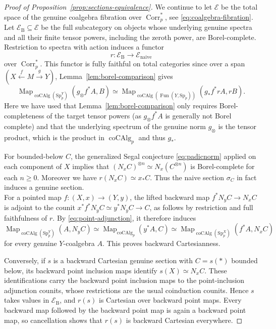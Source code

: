 \documentclass[11pt,a4paper]{article}
\theoremstyle{definition}
\newcommand{\Sp}{\mathrm{Sp}}
\newcommand{\coAlg}{\operatorname{coCAlg}}
\newcommand{\Map}{\operatorname{Map}}
\newcommand{\Fun}{\operatorname{Fun}}
\newcommand{\Corr}{\operatorname{Corr}_p}
\begin{document}
\begin{proof}[Proof of Proposition~\ref{prop:sections-equivalence}]
We continue to let $\mathcal E$ be the total space of the genuine coalgebra fibration over $\Corr^{*}$, see \eqref{eq:coalgebra-fibration}.
Let
$\mathcal E_{\mathrm B}\subseteq\mathcal E$ be the full
subcategory on objects whose underlying genuine spectra and all their
finite tensor powers, including the zeroth power, are
Borel-complete. Restriction to spectra with action induces a functor
\[
 r:\mathcal E_{\mathrm B}\longrightarrow\mathcal E_{\mathrm{naive}}
\]
 over $\Corr^*$. %
This functor is fully faithful on total categories
since over a span $(X\xleftarrow{f}M\xrightarrow{g}Y)$,
Lemma~\ref{lem:borel-comparison} gives
\[
 \Map_{\coAlg(\Sp_p^Y)}(g_\otimes f^*A,B)
 \simeq
 \Map_{\coAlg(\Fun(Y,\Sp_p))}(g_*f^*rA,rB).
\]
Here we have used  that Lemma~\ref{lem:borel-comparison} 
only requires
Borel-completeness of the target tensor powers (as $g_\otimes f^*A$ is generally not Borel complete) and that the underlying spectrum of the genuine norm $g_\otimes$ is the tensor product, which is the product in $\coAlg_p$ and thus $g_*$. 

For bounded-below $C$, the generalized Segal conjecture \eqref{eq:padicnorm} applied on each
component of $X$ implies that
$
 (N_xC)^{\otimes n}\simeq N_x(C^{\otimes n})
$
is Borel-complete for each $n\ge0$. Moreover we have $r(N_xC)\simeq x_*C$.
Thus  the naive section $\sigma_C$ in fact induces a genuine section.  \\

For a pointed map $f:(X,x)\to(Y,y)$, the lifted backward map
$f^*N_yC\to N_xC$ is adjoint to the counit
$x^*f^*N_yC\simeq y^*N_yC\to C$, as follows by restriction
and full faithfulness of $r$.
By \eqref{eq:point-adjunction}, it therefore induces
\[
 \Map_{\coAlg(\Sp_p^Y)}(A,N_yC)
 \simeq\Map_{\coAlg_p}(y^*A,C)
 \simeq\Map_{\coAlg(\Sp_p^X)}(f^*A,N_xC)
\]
for every genuine $Y$-coalgebra $A$. This proves backward
Cartesianness.

Conversely, if $s$ is a backward Cartesian genuine section with
$C=s(*)$ bounded below, its backward point inclusion maps identify
$s(X)\simeq N_xC$. These identifications carry the backward
point inclusion maps to the point-inclusion adjunction counits, whose restrictions
are the usual coinduction counits. Hence $s$
takes values in $\mathcal E_{\mathrm B}$, and $r(s)$ is
Cartesian over backward point maps. Every backward map followed
by the backward point map is again a backward point map, so
cancellation shows that $r(s)$ is backward Cartesian everywhere.


\end{proof}
\end{document}
